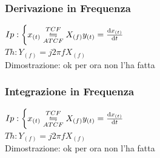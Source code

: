        \subsubsection{Derivazione in Frequenza}\label{Derivazione in Frequenza}
            $Ip:\begin{cases}
                x_{(t)}\overunderset{TCF}{ATCF}{\leftrightharpoons} X_{(f)}
                y_{(t)}= \derivative{x_{(t)}}{t}\\        
            \end{cases}$\\
            $Th: Y_{(f)} = j2\pi f X_{(f)} $ \\
            Dimostrazione: ok per ora non l'ha fatta
                
        \subsubsection{Integrazione in Frequenza}\label{Integrazione in Frequenza}
            $Ip:\begin{cases}
                x_{(t)}\overunderset{TCF}{ATCF}{\leftrightharpoons} X_{(f)}
                y_{(t)}= \derivative{x_{(t)}}{t}\\        
            \end{cases}$\\
            $Th: Y_{(f)} = j2\pi f X_{(f)} $ \\
            Dimostrazione: ok per ora non l'ha fatta

                        
